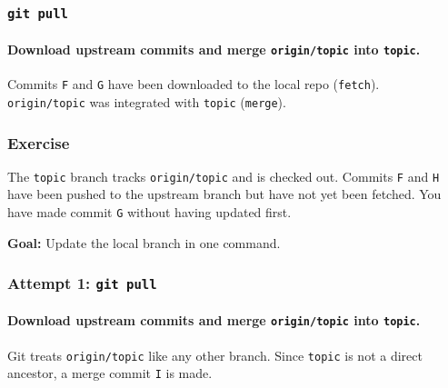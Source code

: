 \documentclass{beamer}
\newcommand\gitcmd[1]{\texttt{git #1}}
\newcommand\gitsubcmd[1]{\texttt{#1}}
\newcommand\grefspec[1]{\texttt{#1}}
\newcommand\gbranch[1]{\texttt{#1}}
\newcommand\gremotebranch[1]{\texttt{#1}}
\newcommand\goal[1]{\textbf{Goal:} #1}
\begin{document}
\begin{frame}
  \frametitle{\gitcmd{pull}}
  \framesubtitle{Download upstream commits and merge \gremotebranch{origin/topic} into \gbranch{topic}.}
  \begin{figure}
    \centering
  \end{figure}

  Commits \grefspec{F} and \grefspec{G} have been downloaded to the local repo (\gitsubcmd{fetch}).\\
  \gremotebranch{origin/topic} was integrated with \gbranch{topic} (\gitsubcmd{merge}).
\end{frame}

\begin{frame}
  \frametitle{Exercise}
  The \gbranch{topic} branch tracks \gremotebranch{origin/topic} and is checked out. Commits \grefspec{F} and \grefspec{H} have been pushed to the upstream branch but have not yet been fetched. You have made commit \grefspec{G} without having updated first.

  \goal{Update the local branch in one command.}

  \begin{figure}
    \centering
  \end{figure}
\end{frame}

\begin{frame}
  \frametitle{Attempt 1: \gitcmd{pull}}
  \framesubtitle{Download upstream commits and merge \gremotebranch{origin/topic} into \gbranch{topic}.}
  \begin{figure}
    \centering
  \end{figure}

  Git treats \gremotebranch{origin/topic} like any other branch. Since \gbranch{topic} is not a direct ancestor, a merge commit \grefspec{I} is made.
\end{frame}
\end{document}
